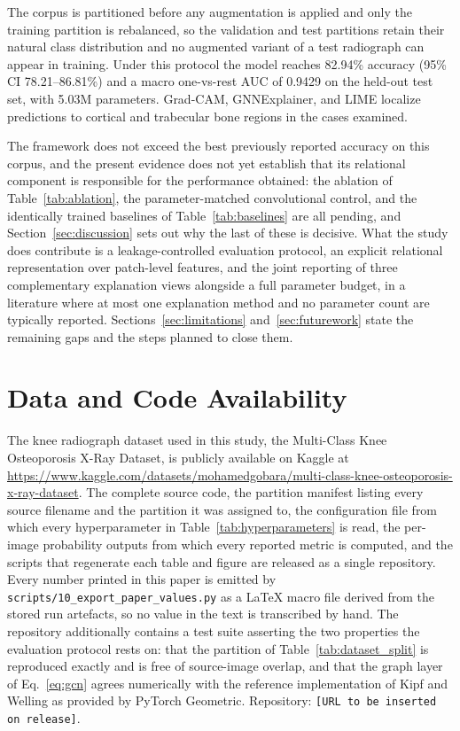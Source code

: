 \documentclass[journal]{IEEEtran}
\begin{document}
The corpus is partitioned before any augmentation is applied and only the
training partition is rebalanced, so the validation and test partitions retain
their natural class distribution and no augmented variant of a test radiograph
can appear in training. Under this protocol the model reaches 82.94\% accuracy
(95\% CI 78.21--86.81\%) and a macro one-vs-rest AUC of 0.9429 on the held-out
test set, with 5.03M parameters. Grad-CAM, GNNExplainer, and LIME localize
predictions to cortical and trabecular bone regions in the cases examined.

The framework does not exceed the best previously reported accuracy on this
corpus, and the present evidence does not yet establish that its relational
component is responsible for the performance obtained: the ablation of
Table~\ref{tab:ablation}, the parameter-matched convolutional control, and the
identically trained baselines of Table~\ref{tab:baselines} are all pending, and
Section~\ref{sec:discussion} sets out why the last of these is decisive. What
the study does contribute is a leakage-controlled evaluation protocol, an
explicit relational representation over patch-level features, and the joint
reporting of three complementary explanation views alongside a full parameter
budget, in a literature where at most one explanation method and no parameter
count are typically reported. Sections~\ref{sec:limitations}
and~\ref{sec:futurework} state the remaining gaps and the steps planned to close
them.

\section*{Data and Code Availability}
The knee radiograph dataset used in this study, the Multi-Class Knee
Osteoporosis X-Ray Dataset, is publicly available on Kaggle
\cite{gobara2024multiclass} at
\url{https://www.kaggle.com/datasets/mohamedgobara/multi-class-knee-osteoporosis-x-ray-dataset}.
The complete source code, the partition manifest listing every source filename
and the partition it was assigned to, the configuration file from which every
hyperparameter in Table~\ref{tab:hyperparameters} is read, the per-image
probability outputs from which every reported metric is computed, and the
scripts that regenerate each table and figure are released as a single
repository. Every number printed in this paper is emitted by
\texttt{scripts/10\_export\_paper\_values.py} as a \LaTeX{} macro file derived
from the stored run artefacts, so no value in the text is transcribed by hand.
The repository additionally contains a test suite asserting the two properties
the evaluation protocol rests on: that the partition of
Table~\ref{tab:dataset_split} is reproduced exactly and is free of
source-image overlap, and that the graph layer of Eq.~\eqref{eq:gcn} agrees
numerically with the reference implementation of Kipf and Welling
\cite{kipf2017semisupervised} as provided by PyTorch Geometric.
Repository: \texttt{[URL to be inserted on release]}.
\end{document}
